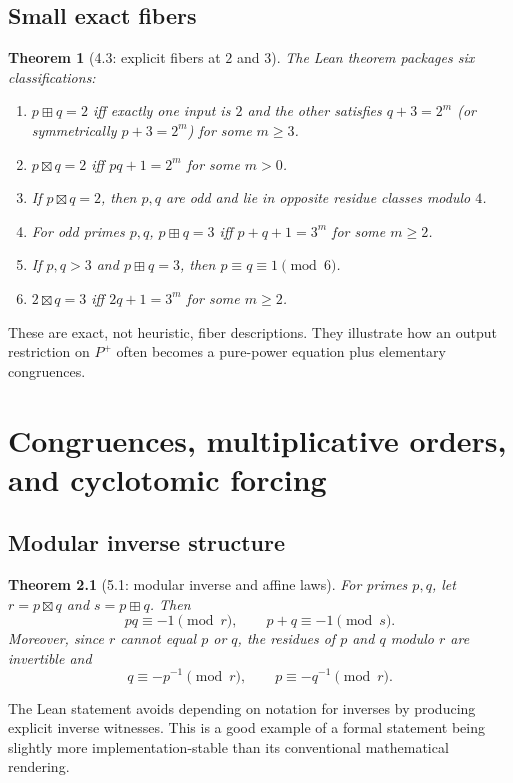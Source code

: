 \documentclass[11pt,a4paper,oneside,open=any,headings=small]{scrbook}
\newtheorem{theorem}{Theorem}[chapter]
\theoremstyle{definition}
\newcommand{\GPF}{P^{+}}
\begin{document}
\section{Small exact fibers}
\begin{theorem}[4.3: explicit fibers at $2$ and $3$]\label{thm:43}
The Lean theorem packages six classifications:
\begin{enumerate}[label=(\alph*)]
\item $p\boxplus q=2$ iff exactly one input is $2$ and the other satisfies $q+3=2^m$ (or symmetrically $p+3=2^m$) for some $m\ge3$.
\item $p\boxtimes q=2$ iff $pq+1=2^m$ for some $m>0$.
\item If $p\boxtimes q=2$, then $p,q$ are odd and lie in opposite residue classes modulo $4$.
\item For odd primes $p,q$, $p\boxplus q=3$ iff $p+q+1=3^m$ for some $m\ge2$.
\item If $p,q>3$ and $p\boxplus q=3$, then $p\equiv q\equiv1\pmod6$.
\item $2\boxtimes q=3$ iff $2q+1=3^m$ for some $m\ge2$.
\end{enumerate}
\end{theorem}

These are exact, not heuristic, fiber descriptions. They illustrate how an output restriction on $\GPF$ often becomes a pure-power equation plus elementary congruences.

\chapter{Congruences, multiplicative orders, and cyclotomic forcing}\label{ch:orders}

\section{Modular inverse structure}
\begin{theorem}[5.1: modular inverse and affine laws]
For primes $p,q$, let $r=p\boxtimes q$ and $s=p\boxplus q$. Then
\[
pq\equiv-1\pmod r,\qquad p+q\equiv-1\pmod s.
\]
Moreover, since $r$ cannot equal $p$ or $q$, the residues of $p$ and $q$ modulo $r$ are invertible and
\[
q\equiv-p^{-1}\pmod r,\qquad p\equiv-q^{-1}\pmod r.
\]
\end{theorem}
The Lean statement avoids depending on notation for inverses by producing explicit inverse witnesses. This is a good example of a formal statement being slightly more implementation-stable than its conventional mathematical rendering.
\end{document}

